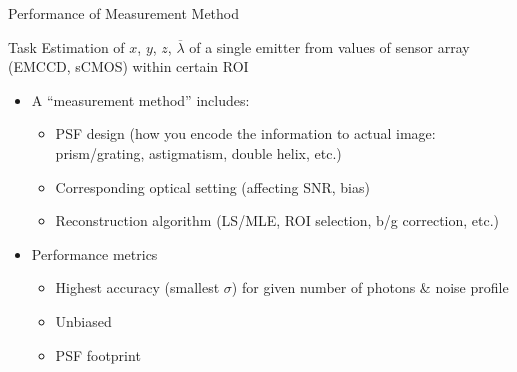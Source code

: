 \documentclass[t]{beamer}
\begin{document}
\begin{frame}{
        Performance of Measurement Method
}
    \begin{block}{Task}
        Estimation of $x$, $y$, $z$, $\overline{\lambda}$ of a single emitter from values of sensor array (EMCCD, sCMOS) within certain ROI
    \end{block}
    \begin{itemize}
         \item A ``measurement method'' includes:
    \begin{itemize}
         \item PSF design (how you encode the information to actual image: prism/grating, astigmatism, double helix, etc.)
         \item Corresponding optical setting (affecting SNR, bias)
         \item Reconstruction algorithm (LS/MLE, ROI selection, b/g correction, etc.) 
    \end{itemize}
         \item Performance metrics
    \begin{itemize}
          \item   Highest accuracy (smallest $\sigma$) for given number of photons \& noise profile
          \item   Unbiased
          \item   PSF footprint
    \end{itemize}
    \end{itemize}
\end{frame}
\end{document}
